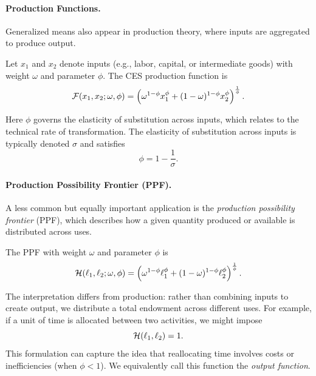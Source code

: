\paragraph{Production Functions.}

Generalized means also appear in production theory, where inputs are aggregated to produce output.

\begin{definition}
\label{def:ces-production}
Let $x_1$ and $x_2$ denote inputs (e.g., labor, capital, or intermediate goods) with weight $\omega$ and parameter $\phi$. The CES production function is
\begin{equation}
\label{eq:ces-production}
\mathcal{F}(x_1, x_2; \omega, \phi) = \left( \omega^{1-\phi} x_1^\phi + (1-\omega)^{1-\phi} x_2^\phi \right)^{\frac{1}{\phi}}.
\end{equation}
\end{definition}
Here $\phi$ governs the elasticity of substitution across inputs, which relates to the technical rate of transformation. The elasticity of substitution across inputs is typically denoted $\sigma$ and satisfies
\begin{equation}
\label{eq:phi-sigma}
\phi = 1 - \frac{1}{\sigma}.
\end{equation}

\paragraph{Production Possibility Frontier (PPF).}

A less common but equally important application is the \emph{production possibility frontier} (PPF), which describes how a given quantity produced or available is distributed across uses.

\begin{definition}
\label{def:allocation}
The PPF with weight $\omega$ and parameter $\phi$ is
\begin{equation}
\label{eq:allocation}
\mathcal{H}(\ell_1, \ell_2; \omega, \phi) = \left( \omega^{1-\phi} \ell_1^\phi + (1-\omega)^{1-\phi} \ell_2^\phi \right)^{\frac{1}{\phi}}.
\end{equation}
\end{definition}
The interpretation differs from production: rather than combining inputs to create output, we distribute a total endowment across different uses. For example, if a unit of time is allocated between two activities, we might impose
\begin{equation}
\mathcal{H}(\ell_1, \ell_2) = 1.
\end{equation}
This formulation can capture the idea that reallocating time involves costs or inefficiencies (when $\phi < 1$). We equivalently call this function the \emph{output function}.

